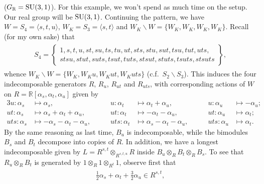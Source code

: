 \noindent\begin{example}\textup{($G_\mathbb{R} = \textup{SU}(3,1)$).} For this example, we won't spend as much time on the setup. Our real group will be $\textup{SU}(3,1)$. Continuing the pattern, we have $W = S_4 = \langle s, t, u \rangle$, $W_K = S_3 = \langle s, t\rangle$ and $W_K\backslash W = \{W_K, W_K, W_K, W_K\}$. Recall (for my own sake) that
\begin{align*}
\begin{split}
S_4 = \left\{\begin{matrix}1, s, t, u, st, su, ts, tu, ut, sts, stu, sut, tsu, tut, uts,\\ stsu, stut, suts, tsut, tuts, stsut, stuts, tsuts, stsuts\end{matrix}\right\},
\end{split}
\end{align*}
\noindent whence $W_K\backslash W = \{W_K, W_Ku, W_Kut, W_Kuts\}$ (c.f.\ $S_2\backslash S_3$). This induces the four indecomposable generators $R$, $R_u$, $R_{ut}$ and $R_{uts}$, with corresponding actions of $W$ on $R = \mathbb{R}[\alpha_s, \alpha_t, \alpha_u]$ given by
\begin{alignat*}{3}
u : \alpha_s &\mapsto \alpha_s, \qquad &u : \alpha_t &\mapsto \alpha_t + \alpha_u, \qquad &u : \alpha_u &\mapsto -\alpha_u;\\
ut : \alpha_s &\mapsto \alpha_s + \alpha_t + \alpha_u, \qquad &ut : \alpha_t &\mapsto -\alpha_t - \alpha_u, \qquad &ut : \alpha_u &\mapsto \alpha_t;\\
uts : \alpha_s &\mapsto -\alpha_s - \alpha_t - \alpha_u, \qquad &uts : \alpha_t &\mapsto \alpha_s - \alpha_t - \alpha_u, \qquad &uts : \alpha_u &\mapsto \alpha_t.
\end{alignat*}
\noindent By the same reasoning as last time, $B_u$ is indecomposable, while the bimodules $B_s$ and $B_t$ decompose into copies of $R$. In addition, we have a longest indecomposable given by $L = R^{s,t} \otimes_{R^{s,t,u}} R$ inside $B_u \otimes_R B_t \otimes_R B_s$. To see that $R_u \otimes_R B_t$ is generated by $1 \otimes_R 1 \otimes_{R^t} 1$, observe first that
\begin{align*}
\begin{split}
\frac{1}{2}\alpha_s + \alpha_t + \frac{3}{2}\alpha_u \in R^{s,t},
\end{split}
\end{align*}
\begin{align*}
\begin{split}

\end{split}
\end{align*}
\end{example}
